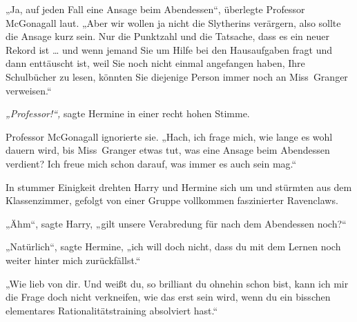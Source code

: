 „Ja, auf jeden Fall eine Ansage beim Abendessen“, überlegte Professor McGonagall laut. „Aber wir wollen ja nicht die Slytherins verärgern, also sollte die Ansage kurz sein. Nur die Punktzahl und die Tatsache, dass es ein neuer Rekord ist … und wenn jemand Sie um Hilfe bei den Hausaufgaben fragt und dann enttäuscht ist, weil Sie noch nicht einmal angefangen haben, Ihre Schulbücher zu lesen, könnten Sie diejenige Person immer noch an Miss~Granger verweisen.“ 

\emph{„Professor!“,} sagte Hermine in einer recht hohen Stimme. 

Professor McGonagall ignorierte sie. „Hach, ich frage mich, wie lange es wohl dauern wird, bis Miss~Granger etwas tut, was eine Ansage beim Abendessen verdient? Ich freue mich schon darauf, was immer es auch sein mag.“ 

In stummer Einigkeit drehten Harry und Hermine sich um und stürmten aus dem Klassenzimmer, gefolgt von einer Gruppe vollkommen faszinierter Ravenclaws. 

„Ähm“, sagte Harry, „gilt unsere Verabredung für nach dem Abendessen noch?“ 

„Natürlich“, sagte Hermine, „ich will doch nicht, dass du mit dem Lernen noch weiter hinter mich zurückfällst.“ 

„Wie lieb von dir. Und weißt du, so brilliant du ohnehin schon bist, kann ich mir die Frage doch nicht verkneifen, wie das erst sein wird, wenn du ein bisschen elementares Rationalitätstraining absolviert hast.“ 

